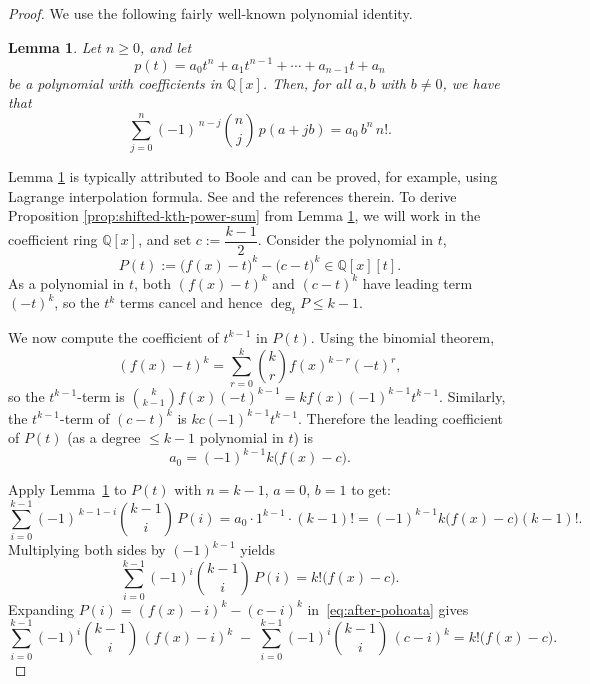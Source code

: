\documentclass[12pt,reqno]{amsart}
\theoremstyle{plain}
\newtheorem{lemma}[theorem]{Lemma}
\theoremstyle{definition}
\newcommand{\1}{\mathbf{1}}
\begin{document}
\begin{proof}
We use the following fairly well-known polynomial identity.

\begin{lemma}\label{lem:boole}
Let $n\ge 0$, and let
\[
p(t)=a_0 t^{n}+a_1 t^{n-1}+\cdots + a_{n-1}t + a_n
\]
be a polynomial with coefficients in $\mathbb{Q}[x]$. Then, for all $a,b$ with $b\neq 0$, we have that
\begin{equation}\label{eq:pohoata}
\sum_{j=0}^{n} (-1)^{\,n-j}\binom{n}{j}\,p(a+j b)=a_0\,b^{n}\,n!.
\end{equation}
\end{lemma}

Lemma \ref{lem:boole} is typically attributed to Boole and can be proved, for example, using Lagrange interpolation formula. See \cite{Pohoata2008} and the references therein. To derive Proposition \ref{prop:shifted-kth-power-sum} from Lemma \ref{lem:boole}, we will work in the coefficient ring $\mathbb{Q}[x]$, and set $c:=\dfrac{k-1}{2}$.
Consider the polynomial in $t$,
\[
P(t):=\bigl(f(x)-t\bigr)^k-\bigl(c-t\bigr)^k \in \mathbb{Q}[x][t].
\]
As a polynomial in $t$, both $(f(x)-t)^k$ and $(c-t)^k$ have leading term $(-t)^k$,
so the $t^k$ terms cancel and hence $\deg_t P\le k-1$.

We now compute the coefficient of $t^{k-1}$ in $P(t)$. Using the binomial theorem,
\[
(f(x)-t)^k=\sum_{r=0}^{k}\binom{k}{r} f(x)^{k-r}(-t)^r,
\]
so the $t^{k-1}$-term is $\binom{k}{k-1}f(x)(-t)^{k-1}=k f(x)(-1)^{k-1}t^{k-1}$.
Similarly, the $t^{k-1}$-term of $(c-t)^k$ is $k c(-1)^{k-1}t^{k-1}$.
Therefore the leading coefficient of $P(t)$ (as a degree $\le k-1$ polynomial in $t$) is
\[
a_0=(-1)^{k-1}k\bigl(f(x)-c\bigr).
\]

Apply Lemma~\ref{lem:boole} to $P(t)$ with $n=k-1$, $a=0$, $b=1$ to get:
\[
\sum_{i=0}^{k-1}(-1)^{\,k-1-i}\binom{k-1}{i}\,P(i)
=a_0\cdot 1^{k-1}\cdot (k-1)!
=(-1)^{k-1}k\bigl(f(x)-c\bigr)(k-1)!.
\]
Multiplying both sides by $(-1)^{k-1}$ yields
\begin{equation}\label{eq:after-pohoata}
\sum_{i=0}^{k-1}(-1)^{i}\binom{k-1}{i}\,P(i)
= k!\bigl(f(x)-c\bigr).
\end{equation}
Expanding $P(i)=(f(x)-i)^k-(c-i)^k$ in~\eqref{eq:after-pohoata} gives
\begin{equation}\label{eq:split}
\sum_{i=0}^{k-1}(-1)^{i}\binom{k-1}{i}\,(f(x)-i)^k
\;-\;
\sum_{i=0}^{k-1}(-1)^{i}\binom{k-1}{i}\,(c-i)^k
= k!\bigl(f(x)-c\bigr).
\end{equation}


\end{proof}
\end{document}
